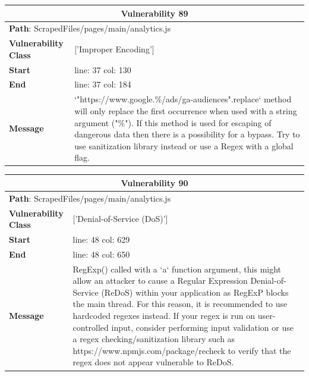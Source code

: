 \documentclass[12pt]{article}
\begin{document}
\vspace{0.7cm}
\FloatBarrier
\begin{table}[!h]
\centering
\renewcommand{\arraystretch}{1.3}
\begin{tabular}{|l|p{10cm}|}
\hline
\multicolumn{2}{|c|}{\textbf{Vulnerability 89}} \\
\hline
\multicolumn{2}{|l|}{\textbf{Path}: ScrapedFiles/pages/main/analytics.js} \\
\hline
\textbf{Vulnerability Class} & ['Improper Encoding'] \\
\hline
\textbf{Start} & line: 37 \quad col: 130 \\
\hline
\textbf{End} & line: 37 \quad col: 184 \\
\hline
\textbf{Message} & `"https://www.google.\%/ads/ga-audiences".replace` method will only replace the first occurrence when used with a string argument ("\%"). If this method is used for escaping of dangerous data then there is a possibility for a bypass. Try to use sanitization library instead or use a Regex with a global flag. \\
\hline
\end{tabular}
\end{table}
\vspace{0.7cm}
\FloatBarrier
\begin{table}[!h]
\centering
\renewcommand{\arraystretch}{1.3}
\begin{tabular}{|l|p{10cm}|}
\hline
\multicolumn{2}{|c|}{\textbf{Vulnerability 90}} \\
\hline
\multicolumn{2}{|l|}{\textbf{Path}: ScrapedFiles/pages/main/analytics.js} \\
\hline
\textbf{Vulnerability Class} & ['Denial-of-Service (DoS)'] \\
\hline
\textbf{Start} & line: 48 \quad col: 629 \\
\hline
\textbf{End} & line: 48 \quad col: 650 \\
\hline
\textbf{Message} & RegExp() called with a `a` function argument, this might allow an attacker to cause a Regular Expression Denial-of-Service (ReDoS) within your application as RegExP blocks the main thread. For this reason, it is recommended to use hardcoded regexes instead. If your regex is run on user-controlled input, consider performing input validation or use a regex checking/sanitization library such as https://www.npmjs.com/package/recheck to verify that the regex does not appear vulnerable to ReDoS. \\
\hline
\end{tabular}
\end{table}
\end{document}
